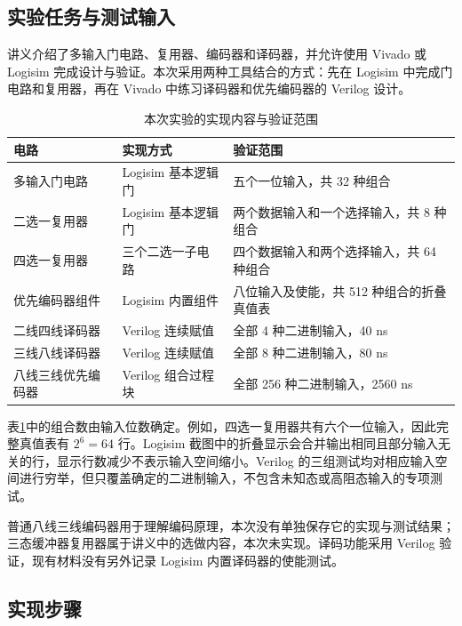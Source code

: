 \documentclass[12pt,a4paper,fontset=fandol]{ctexart}
\begin{document}
\subsection{实验任务与测试输入}

讲义介绍了多输入门电路、复用器、编码器和译码器，并允许使用 Vivado 或 Logisim 完成设计与验证。本次采用两种工具结合的方式：先在 Logisim 中完成门电路和复用器，再在 Vivado 中练习译码器和优先编码器的 Verilog 设计。

\begin{table}[H]
\centering
\caption{本次实验的实现内容与验证范围}
\label{tab:scope}
\small
\begin{tabular}{p{3.0cm}p{3.5cm}p{8.0cm}}
\toprule
电路 & 实现方式 & 验证范围 \\
\midrule
多输入门电路 & Logisim 基本逻辑门 & 五个一位输入，共 32 种组合 \\
二选一复用器 & Logisim 基本逻辑门 & 两个数据输入和一个选择输入，共 8 种组合 \\
四选一复用器 & 三个二选一子电路 & 四个数据输入和两个选择输入，共 64 种组合 \\
优先编码器组件 & Logisim 内置组件 & 八位输入及使能，共 512 种组合的折叠真值表 \\
二线四线译码器 & Verilog 连续赋值 & 全部 4 种二进制输入，40 ns \\
三线八线译码器 & Verilog 连续赋值 & 全部 8 种二进制输入，80 ns \\
八线三线优先编码器 & Verilog 组合过程块 & 全部 256 种二进制输入，2560 ns \\
\bottomrule
\end{tabular}
\end{table}

表\ref{tab:scope}中的组合数由输入位数确定。例如，四选一复用器共有六个一位输入，因此完整真值表有 $2^6=64$ 行。Logisim 截图中的折叠显示会合并输出相同且部分输入无关的行，显示行数减少不表示输入空间缩小。Verilog 的三组测试均对相应输入空间进行穷举，但只覆盖确定的二进制输入，不包含未知态或高阻态输入的专项测试。

普通八线三线编码器用于理解编码原理，本次没有单独保存它的实现与测试结果；三态缓冲器复用器属于讲义中的选做内容，本次未实现。译码功能采用 Verilog 验证，现有材料没有另外记录 Logisim 内置译码器的使能测试。

\subsection{实现步骤}
\end{document}
